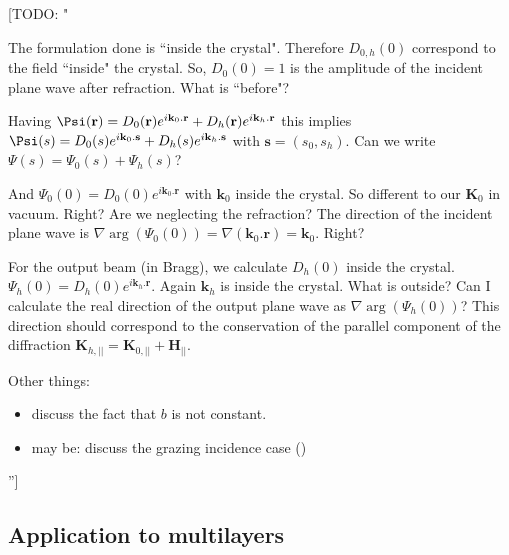 \documentclass[preprint]{iucr}              %
\newcommand{\todo}[1]{{\color{red}[TODO: "#1'']}}
\newcommand{\inred}[1]{{\color{red}#1}}
\begin{document}
\todo{

The formulation done is ``inside the crystal". Therefore $D_{0,h}(0)$ correspond to the field ``inside" the crystal. So, $D_0(0)=1$ is the amplitude of the incident plane wave after refraction. What is ``before"?


Having $\Psi(\textbf r) = D_0(\textbf r) e^{i \textbf k_0 . \textbf r} + D_h(\textbf r) e^{i \textbf k_h . \textbf r}$ this implies $\Psi(s) = D_0(s) e^{i \textbf k_0 . \textbf{s}} + D_h(s) e^{i \textbf k_h . \textbf s}$ with $\textbf{s}=(s_0,s_h)$. Can we write $\Psi(s)=\Psi_0(s)+\Psi_h(s)$?


And $\Psi_0(0)=D_0(0) e^{i \textbf{k}_0. \textbf{r}}$ with $\textbf{k}_0$ inside the crystal. So different to our $\textbf{K}_0$ in vacuum. Right? Are we neglecting the refraction?
The direction of the incident plane wave is $\nabla  \arg(\Psi_0(0))= \nabla  (\textbf{k}_0 . \textbf{r}) = \textbf{k}_0 $. Right?

For the output beam (in Bragg), we calculate $D_h(0)$ inside the crystal.  $\Psi_h(0)=D_h(0) e^{i \textbf{k}_h . \textbf{r}}$. Again $\textbf{k}_h$ is inside the crystal. What is outside? Can I calculate the real direction of the output plane wave as $\nabla  \arg(\Psi_h(0))$? This direction should correspond to the conservation of the parallel component of the diffraction $\textbf{K}_{h,||}= \textbf{K}_{0,||} + \textbf{H}_{||}$. 

Other things: 
\begin{itemize}
    \item discuss the fact that $b$ is not constant.
    \item may be: discuss the grazing incidence case (\cite{Yashiro2001, Stepanov1998})
\end{itemize}
}

\inred{
\subsection{Application to multilayers}
}\label{sec:multilayers}
\end{document}
